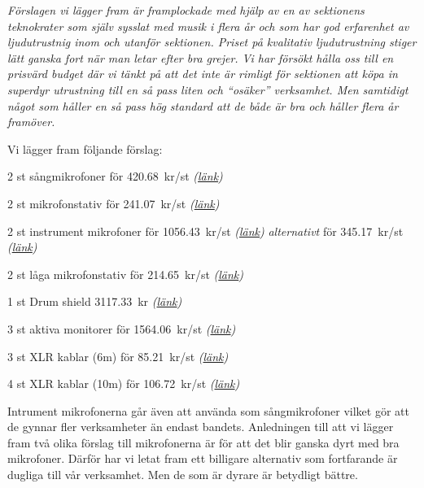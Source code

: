 \documentclass[../_main/handlingar.tex]{subfiles}
\begin{document}
\textit{Förslagen vi lägger fram är framplockade med hjälp av en av sektionens teknokrater som själv sysslat med musik i flera år och som har god erfarenhet av ljudutrustnig inom och utanför sektionen. Priset på kvalitativ ljudutrustning stiger lätt ganska fort när man letar efter bra grejer. Vi har försökt hålla oss till en prisvärd budget där vi tänkt på att det inte är rimligt för sektionen att köpa in superdyr utrustning till en så pass liten och ``osäker'' verksamhet. Men samtidigt något som håller en så pass hög standard att de både är bra och håller flera år framöver.}

Vi lägger fram följande förslag:
\begin{dashlist}
    \item 2 st sångmikrofoner för \SI{420,68}{kr/st} \textit{(\href{https://www.thomann.de/se/the_tbone_mb85_beta.htm}{länk})}
    \item 2 st mikrofonstativ för \SI{241,07}{kr/st} \textit{(\href{https://www.thomann.de/se/km_27115.htm}{länk})}
    \item 2 st instrument mikrofoner för \SI{1056,43}{kr/st} \textit{(\href{https://www.thomann.de/se/shure_sm57_lc.htm}{länk})} \textit{alternativt} för \SI{345,17}{kr/st} \textit{(\href{https://www.thomann.de/se/the_tbone_mb75.htm}{länk})}
    \item 2 st låga mikrofonstativ för \SI{214,65}{kr/st} \textit{(\href{https://www.thomann.de/se/millenium_ms2006.htm}{länk})}
    \item 1 st Drum shield \SI{3117,33}{kr} \textit{(\href{https://www.thomann.de/se/the_t.akustik_ds4_4_drum_shield.htm}{länk})}
    \item 3 st aktiva monitorer för \SI{1564,06}{kr/st} \textit{(\href{https://www.thomann.de/se/behringer_f1220_eurolive.htm}{länk})}
    \item 3 st XLR kablar (6m) för \SI{85,21}{kr/st} \textit{(\href{https://www.thomann.de/se/pro_snake_tpm_6.htm}{länk})}
    \item 4 st XLR kablar (10m) för \SI{106,72}{kr/st} \textit{(\href{https://www.thomann.de/se/pro_snake_tpm_10.htm}{länk})}
\end{dashlist}

Intrument mikrofonerna går även att använda som sångmikrofoner vilket gör att de gynnar fler verksamheter än endast bandets. Anledningen till att vi lägger fram två olika förslag till mikrofonerna är för att det blir ganska dyrt med bra mikrofoner. Därför har vi letat fram ett billigare alternativ som fortfarande är dugliga till vår verksamhet. Men de som är dyrare är betydligt bättre.
\end{document}

